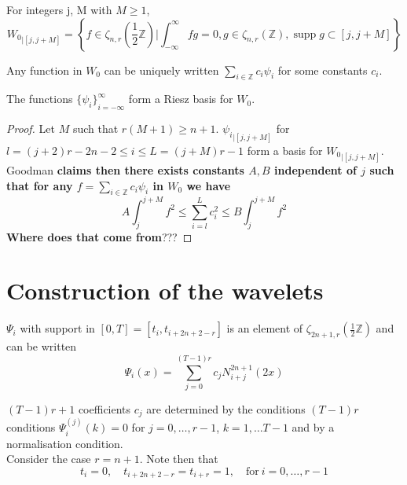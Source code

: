 \documentclass[a4paper, 11pt]{article}
\DeclareMathOperator*{\supp}{supp}
\begin{document}
\begin{cor}{4.2}
  For integers j, M with $M \geq 1$,
  \begin{equation}
    {W_0}_{|[j,j+M]} = \left\{f \in \zeta_{n,r}(\frac{1}{2}\mathbb{Z}) | \int_{-\infty}^{\infty} fg = 0, g \in 
    \zeta_{n,r}(\mathbb{Z}), \supp g \subset [j, j+M] \right\}
  \end{equation}
\end{cor}

\begin{cor}{4.3}
  Any function in $W_0$ can be uniquely written $\sum_{i \in \mathbb{Z}} c_i \psi_i$ for some constants $c_i$.
\end{cor}

\begin{cor}{4.4}
  The functions ${\{\psi_i\}}_{i=-\infty}^{\infty}$ form a Riesz basis for $W_0$.
\end{cor}

\begin{proof} Let $M$ such that $r(M+1) \geq n+1$. ${\psi_i}_{|[j,j+M]}$ for $l=(j+2)r-2n-2 \leq i \leq L=(j+M)r-1$ form 
  a basis for ${W_0}_{|[j,j+M]}$. Goodman \textbf{claims then there exists constants $A,B$ independent of $j$ such that 
  for any $f = \sum_{i \in \mathbb{Z}} c_i \psi_i$ in $W_0$ we have}
  \begin{equation*}
    A \int_{j}^{j+M} f^2 \leq \sum_{i=l}^L c_i^2 \leq B \int_{j}^{j+M} f^2
  \end{equation*}
  \textbf{Where does that come from}???
\end{proof}

\section{Construction of the wavelets}

$\Psi_i$ with support in $[0,T] = [t_i, t_{i+2n+2-r}]$ is an element of $\zeta_{2n+1,r}(\frac{1}{2}\mathbb{Z})$ and can 
be written
\begin{equation*}
  \Psi_i(x) = \sum_{j=0}^{(T-1)r} c_j N_{i+j}^{2n+1}(2x)
\end{equation*}

$(T-1)r+1$ coefficients $c_j$ are determined by the conditions $(T-1)r$ conditions $\Psi_i^{(j)}(k) = 0$ for $j=0, 
\ldots, r-1$, $k = 1, \ldots T-1$ and by a normalisation condition. \\

Consider the case $r = n+1$. Note then that
\begin{equation*}
  t_i = 0, \quad t_{i+2n+2-r} = t_{i+r} = 1, \quad \text{for} \ i=0, \ldots, r-1
\end{equation*}
\end{document}
